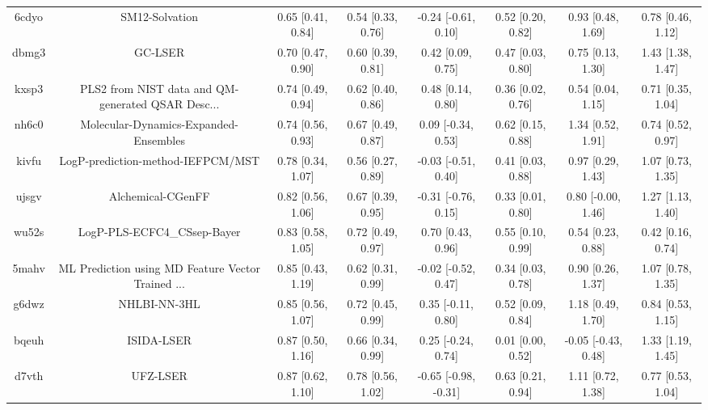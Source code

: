 \documentclass{article}
\begin{document}
\begin{center}
\begin{longtable}{|cccccccc|}
 6cdyo &                                     SM12-Solvation &  0.65 [0.41, 0.84] &  0.54 [0.33, 0.76] &   -0.24 [-0.61, 0.10] &  0.52 [0.20, 0.82] &    0.93 [0.48, 1.69] &     0.78 [0.46, 1.12] \\
 dbmg3 &                                            GC-LSER &  0.70 [0.47, 0.90] &  0.60 [0.39, 0.81] &     0.42 [0.09, 0.75] &  0.47 [0.03, 0.80] &    0.75 [0.13, 1.30] &     1.43 [1.38, 1.47] \\
 kxsp3 &  PLS2 from NIST data and QM-generated QSAR Desc... &  0.74 [0.49, 0.94] &  0.62 [0.40, 0.86] &     0.48 [0.14, 0.80] &  0.36 [0.02, 0.76] &    0.54 [0.04, 1.15] &     0.71 [0.35, 1.04] \\
 nh6c0 &              Molecular-Dynamics-Expanded-Ensembles &  0.74 [0.56, 0.93] &  0.67 [0.49, 0.87] &    0.09 [-0.34, 0.53] &  0.62 [0.15, 0.88] &    1.34 [0.52, 1.91] &     0.74 [0.52, 0.97] \\
 kivfu &                  LogP-prediction-method-IEFPCM/MST &  0.78 [0.34, 1.07] &  0.56 [0.27, 0.89] &   -0.03 [-0.51, 0.40] &  0.41 [0.03, 0.88] &    0.97 [0.29, 1.43] &     1.07 [0.73, 1.35] \\
 ujsgv &                                  Alchemical-CGenFF &  0.82 [0.56, 1.06] &  0.67 [0.39, 0.95] &   -0.31 [-0.76, 0.15] &  0.33 [0.01, 0.80] &   0.80 [-0.00, 1.46] &     1.27 [1.13, 1.40] \\
 wu52s &                        LogP-PLS-ECFC4\_CSsep-Bayer &  0.83 [0.58, 1.05] &  0.72 [0.49, 0.97] &     0.70 [0.43, 0.96] &  0.55 [0.10, 0.99] &    0.54 [0.23, 0.88] &     0.42 [0.16, 0.74] \\
 5mahv &  ML Prediction using MD Feature Vector Trained ... &  0.85 [0.43, 1.19] &  0.62 [0.31, 0.99] &   -0.02 [-0.52, 0.47] &  0.34 [0.03, 0.78] &    0.90 [0.26, 1.37] &     1.07 [0.78, 1.35] \\
 g6dwz &                                       NHLBI-NN-3HL &  0.85 [0.56, 1.07] &  0.72 [0.45, 0.99] &    0.35 [-0.11, 0.80] &  0.52 [0.09, 0.84] &    1.18 [0.49, 1.70] &     0.84 [0.53, 1.15] \\
 bqeuh &                                         ISIDA-LSER &  0.87 [0.50, 1.16] &  0.66 [0.34, 0.99] &    0.25 [-0.24, 0.74] &  0.01 [0.00, 0.52] &  -0.05 [-0.43, 0.48] &     1.33 [1.19, 1.45] \\
 d7vth &                                           UFZ-LSER &  0.87 [0.62, 1.10] &  0.78 [0.56, 1.02] &  -0.65 [-0.98, -0.31] &  0.63 [0.21, 0.94] &    1.11 [0.72, 1.38] &     0.77 [0.53, 1.04] \\

\end{longtable}
\end{center}
\end{document}
